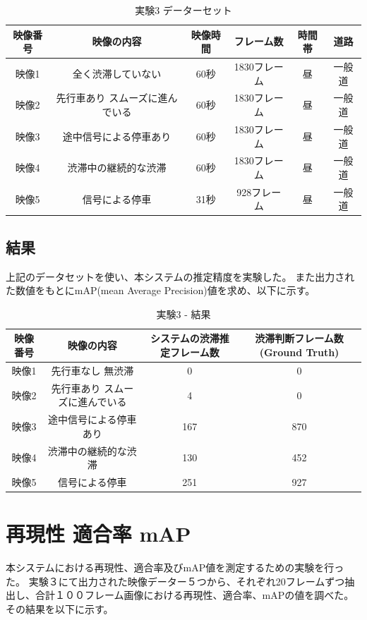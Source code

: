 \begin{table}[htbp]
  \centering
  \begin{scriptsize}
  \begin{tabular}{cccccc}
  \toprule
映像番号 & 映像の内容 & 映像時間 & フレーム数 & 時間帯 & 道路 \\
  \midrule
映像1 & 全く渋滞していない & 60秒 & 1830フレーム & 昼 & 一般道 \\
映像2 & 先行車あり スムーズに進んでいる & 60秒 & 1830フレーム & 昼 & 一般道 \\
映像3 & 途中信号による停車あり & 60秒 & 1830フレーム & 昼 & 一般道 \\
映像4 & 渋滞中の継続的な渋滞 & 60秒 & 1830フレーム & 昼 & 一般道 \\
映像5 & 信号による停車 & 31秒& 928フレーム & 昼 & 一般道 \\
  \bottomrule
  \end{tabular}
  \end{scriptsize}
  \caption{実験3 データーセット}
  \label{tab:exp_dataset3}
\end{table}

\subsection{結果}
上記のデータセットを使い、本システムの推定精度を実験した。
また出力された数値をもとにmAP(mean Average Precision)値を求め、以下に示す。

\begin{table}[htbp]
  \centering
  \begin{scriptsize}
  \begin{tabular}{cccc}
  \toprule
映像番号 & 映像の内容 & システムの渋滞推定フレーム数 & 渋滞判断フレーム数(Ground Truth)\\
  \midrule
映像1 & 先行車なし 無渋滞 & 0 & 0 \\
映像2 & 先行車あり スムーズに進んでいる & 4 & 0 \\
映像3 & 途中信号による停車あり & 167 & 870\\
映像4 & 渋滞中の継続的な渋滞 & 130 & 452\\
映像5 & 信号による停車 & 251 & 927 \\
\bottomrule
\end{tabular}
\end{scriptsize}
  \caption{実験3 - 結果}
  \label{tab:exp3_fig}
\end{table}

\section{再現性 適合率 mAP}
本システムにおける再現性、適合率及びmAP値を測定するための実験を行った。
実験３にて出力された映像データー５つから、それぞれ20フレームずつ抽出し、合計１００フレーム画像における再現性、適合率、mAPの値を調べた。
その結果を以下に示す。